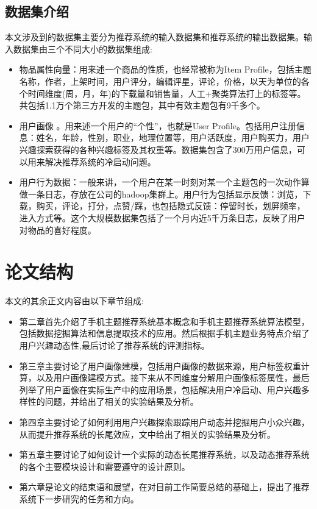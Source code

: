 		\subsection{数据集介绍}
		本文涉及到的数据集主要分为推荐系统的输入数据集和推荐系统的输出数据集。输入数据集由三个不同大小的数据集组成:
		\begin{itemize}
			\item 物品属性向量：用来述一个商品的性质，也经常被称为Item Profile，包括主题名称，作者，上架时间，用户评分，编辑评星，评论，价格，以天为单位的各个时间维度(周，月，年)的下载量和销售量，人工+聚类算法打上的标签等。共包括1.1万个第三方开发的主题包，其中有效主题包有9千多个。
			\item 用户画像 。用来述一个用户的“个性”，也就是User Profile。包括用户注册信息：姓名，年龄，性别，职业，地理位置等，用户活跃度，用户购买力，用户兴趣探索获得的各种兴趣标签及其权重等。数据集包含了300万用户信息，可以用来解决推荐系统的冷启动问题。
			\item 用户行为数据：一般来讲，一个用户在某一时刻对某一个主题包的一次动作算做一条日志，存放在公司的hadoop集群上。用户行为包括显示反馈：浏览，下载，购买，评论，打分，点赞/踩，也包括隐式反馈：停留时长，划屏频率，进入方式等。这个大规模数据集包括了一个月内近5千万条日志，反映了用户对物品的喜好程度。
		\end{itemize}

	\section{论文结构}
	本文的其余正文内容由以下章节组成:
	\begin{itemize}
		\item 第二章首先介绍了手机主题推荐系统基本概念和手机主题推荐系统算法模型，包括数据挖掘算法\citep{date-mining}和信息提取技术\citep{info-retrieval}的应用。然后根据手机主题业务特点介绍了用户兴趣动态性,最后讨论了推荐系统的评测指标。
		\item 第三章主要讨论了用户画像建模，包括用户画像的数据来源，用户标签权重计算，以及用户画像建模方式。接下来从不同维度分解用户画像标签属性，最后列举了用户画像在实际生产中的应用场景，包括解决用户冷启动、用户兴趣多样性的问题，并给出了相关的实验结果及分析。
		\item 第四章主要讨论了如何利用用户兴趣探索跟踪用户动态并挖掘用户小众兴趣，从而提升推荐系统的长尾效应，文中给出了相关的实验结果及分析。
		\item 第五章主要讨论了如何设计一个实际的动态长尾推荐系统，以及动态推荐系统的各个主要模块设计和需要遵守的设计原则。
		\item 第六章是论文的结束语和展望，在对目前工作简要总结的基础上，提出了推荐系统下一步研究的任务和方向。
	\end{itemize}